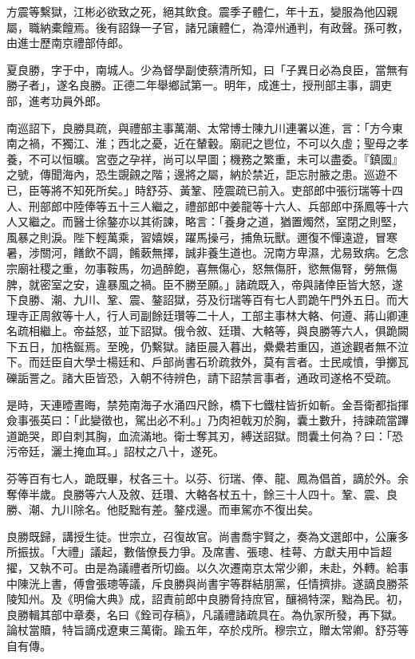 \begin{pinyinscope}
方震等繫獄，江彬必欲致之死，絕其飲食。震季子體仁，年十五，變服為他囚親屬，職納橐饘焉。後有詔錄一子官，諸兄讓體仁，為漳州通判，有政聲。孫可教，由進士歷南京禮部侍郎。

夏良勝，字于中，南城人。少為督學副使蔡清所知，曰「子異日必為良臣，當無有勝子者」，遂名良勝。正德二年舉鄉試第一。明年，成進士，授刑部主事，調吏部，進考功員外郎。

南巡詔下，良勝具疏，與禮部主事萬潮、太常博士陳九川連署以進，言：「方今東南之禍，不獨江、淮；西北之憂，近在輦轂。廟祀之鬯位，不可以久虛；聖母之孝養，不可以恒曠。宮壺之孕祥，尚可以早圖；機務之繁重，未可以盡委。『鎮國』之號，傳聞海內，恐生覬覦之階；邊將之屬，納於禁近，詎忘肘腋之患。巡遊不已，臣等將不知死所矣。」時舒芬、黃鞏、陸震疏已前入。吏部郎中張衍瑞等十四人、刑部郎中陸俸等五十三人繼之，禮部郎中姜龍等十六人、兵部郎中孫鳳等十六人又繼之。而醫士徐鏊亦以其術諫，略言：「養身之道，猶置燭然，室閉之則堅，風暴之則淚。陛下輕萬乘，習嬉娛，躍馬操弓，捕魚玩獸。邇復不憚遠遊，冒寒暑，涉關河，饍飲不調，餚蔌無擇，誠非養生道也。況南方卑濕，尤易致病。乞念宗廟社稷之重，勿事鞍馬，勿過醉飽，喜無傷心，怒無傷肝，慾無傷腎，勞無傷脾，就密室之安，違暴風之禍。臣不勝至願。」諸疏既入，帝與諸倖臣皆大怒，遂下良勝、潮、九川、鞏、震、鏊詔獄，芬及衍瑞等百有七人罰跪午門外五日。而大理寺正周敘等十人，行人司副餘廷瓚等二十人，工部主事林大輅、何遵、蔣山卿連名疏相繼上。帝益怒，並下詔獄。俄令敘、廷瓚、大輅等，與良勝等六人，俱跪闕下五日，加梏鋋焉。至晚，仍繫獄。諸臣晨入暮出，纍纍若重囚，道途觀者無不泣下。而廷臣自大學士楊廷和、戶部尚書石玠疏救外，莫有言者。士民咸憤，爭擲瓦礫詬詈之。諸大臣皆恐，入朝不待辨色，請下詔禁言事者，通政司遂格不受疏。

是時，天連曀晝晦，禁苑南海子水涌四尺餘，橋下七鐵柱皆折如斬。金吾衛都指揮僉事張英曰：「此變徵也，駕出必不利。」乃肉袒戟刃於胸，囊土數升，持諫疏當蹕道跪哭，即自刺其胸，血流滿地。衛士奪其刃，縛送詔獄。問囊土何為？曰：「恐污帝廷，灑土掩血耳。」詔杖之八十，遂死。

芬等百有七人，跪既畢，杖各三十。以芬、衍瑞、俸、龍、鳳為倡首，謫於外。余奪俸半歲。良勝等六人及敘、廷瓚、大輅各杖五十，餘三十人四十。鞏、震、良勝、潮、九川除名。他貶黜有差。鏊戍邊。而車駕亦不復出矣。

良勝既歸，講授生徒。世宗立，召復故官。尚書喬宇賢之，奏為文選郎中，公廉多所振拔。「大禮」議起，數偕僚長力爭。及席書、張璁、桂萼、方獻夫用中旨超擢，又執不可。由是為議禮者所切齒。以久次遷南京太常少卿，未赴，外轉。給事中陳洸上書，傅會張璁等議，斥良勝與尚書宇等群結朋黨，任情擠排。遂謫良勝茶陵知州。及《明倫大典》成，詔責前郎中良勝脅持庶官，釀禍特深，黜為民。初，良勝輯其部中章奏，名曰《銓司存稿》，凡議禮諸疏具在。為仇家所發，再下獄。論杖當贖，特旨謫戍遼東三萬衛。踰五年，卒於戍所。穆宗立，贈太常卿。舒芬等自有傳。


\end{pinyinscope}

